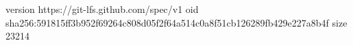 version https://git-lfs.github.com/spec/v1
oid sha256:591815ff3b952f69264c808d05f2f64a514c0a8f51cb126289fb429e227a8b4f
size 23214
